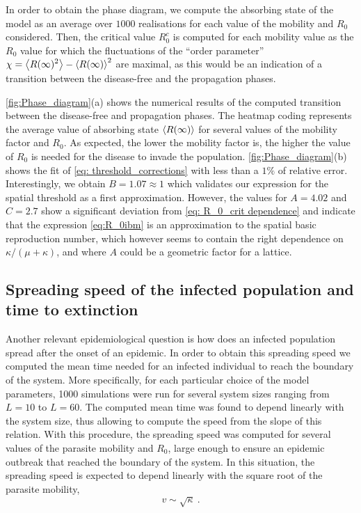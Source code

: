 In order to obtain the phase diagram, we compute the absorbing state of the
model as an average over $1000$ realisations for each value of the mobility and
$R_0$ considered. Then, the critical value $R_0^c$ is computed for each
mobility value as the $R_0$ value for which the fluctuations of the ``order
parameter'' $\displaystyle \chi=\left<{R(\infty})^2\right>-\left<R(\infty)\right>^2$ are
maximal, as this would be an indication of a transition between the
disease-free and the propagation phases.

\cref{fig:Phase_diagram}(a) shows the numerical results of the computed
transition between the disease-free and propagation phases. The heatmap coding
represents the average value of absorbing state $\left<R(\infty)\right>$ for several
values of the mobility factor and $R_0$. As expected, the lower the mobility
factor is, the higher the value of $R_0$ is needed for the disease to invade
the population. \cref{fig:Phase_diagram}(b) shows the fit of \cref{eq:
    threshold_corrections} with less than a $1\%$ of relative error.
Interestingly,
we obtain $B=1.07\approx1$ which validates our expression for the spatial
threshold as a first approximation. However, the values for $A=4.02$ and
$C=2.7$ show a significant deviation from \cref{eq: R_0_crit dependence} and
indicate that the expression \cref{eq:R_0ibm} is  an approximation to the
spatial basic reproduction number, which however seems to contain the right
dependence on $\kappa/(\mu+\kappa)$, and where $A$ could be a geometric factor
for a lattice.

\subsection{Spreading speed of the infected population and time to extinction}

Another relevant epidemiological question is how does an infected
population spread after the onset of an epidemic. In order to obtain this
spreading speed we computed the mean time needed for an infected individual to
reach the boundary of the system. More specifically, for each particular choice
of the model parameters, 1000 simulations were run for several system sizes
ranging from $L=10$ to $L=60$. The computed mean time was found to depend
linearly with the system size, thus allowing to compute the speed from the
slope of this relation. With this procedure, the spreading speed was computed
for several values of the parasite mobility and $R_0$, large enough to ensure
an epidemic outbreak that reached the boundary of the system. In this
situation, the spreading speed is expected to depend linearly with the square
root of the parasite mobility,
\begin{equation}\label{eq:front_vel}
    v\sim\sqrt{\kappa} \ .
\end{equation}

